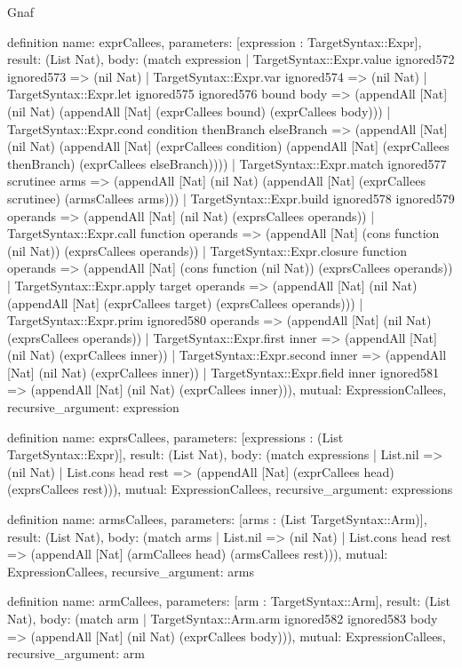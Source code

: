 \begin{lexlean}{Gnaf}
\begin{semanticmodule}
definition{
  name: exprCallees,
  parameters: [expression : TargetSyntax::Expr],
  result: (List Nat),
  body: (match expression
    | TargetSyntax::Expr.value ignored572 ignored573 => (nil Nat)
    | TargetSyntax::Expr.var ignored574 => (nil Nat)
    | TargetSyntax::Expr.let ignored575 ignored576 bound body => (appendAll [Nat] (nil Nat) (appendAll [Nat] (exprCallees bound) (exprCallees body)))
    | TargetSyntax::Expr.cond condition thenBranch elseBranch => (appendAll [Nat] (nil Nat) (appendAll [Nat] (exprCallees condition) (appendAll [Nat] (exprCallees thenBranch) (exprCallees elseBranch))))
    | TargetSyntax::Expr.match ignored577 scrutinee arms => (appendAll [Nat] (nil Nat) (appendAll [Nat] (exprCallees scrutinee) (armsCallees arms)))
    | TargetSyntax::Expr.build ignored578 ignored579 operands => (appendAll [Nat] (nil Nat) (exprsCallees operands))
    | TargetSyntax::Expr.call function operands => (appendAll [Nat] (cons function (nil Nat)) (exprsCallees operands))
    | TargetSyntax::Expr.closure function operands => (appendAll [Nat] (cons function (nil Nat)) (exprsCallees operands))
    | TargetSyntax::Expr.apply target operands => (appendAll [Nat] (nil Nat) (appendAll [Nat] (exprCallees target) (exprsCallees operands)))
    | TargetSyntax::Expr.prim ignored580 operands => (appendAll [Nat] (nil Nat) (exprsCallees operands))
    | TargetSyntax::Expr.first inner => (appendAll [Nat] (nil Nat) (exprCallees inner))
    | TargetSyntax::Expr.second inner => (appendAll [Nat] (nil Nat) (exprCallees inner))
    | TargetSyntax::Expr.field inner ignored581 => (appendAll [Nat] (nil Nat) (exprCallees inner))),
  mutual: ExpressionCallees,
  recursive_argument: expression
}

definition{
  name: exprsCallees,
  parameters: [expressions : (List TargetSyntax::Expr)],
  result: (List Nat),
  body: (match expressions
    | List.nil => (nil Nat)
    | List.cons head rest => (appendAll [Nat] (exprCallees head) (exprsCallees rest))),
  mutual: ExpressionCallees,
  recursive_argument: expressions
}

definition{
  name: armsCallees,
  parameters: [arms : (List TargetSyntax::Arm)],
  result: (List Nat),
  body: (match arms
    | List.nil => (nil Nat)
    | List.cons head rest => (appendAll [Nat] (armCallees head) (armsCallees rest))),
  mutual: ExpressionCallees,
  recursive_argument: arms
}

definition{
  name: armCallees,
  parameters: [arm : TargetSyntax::Arm],
  result: (List Nat),
  body: (match arm
    | TargetSyntax::Arm.arm ignored582 ignored583 body => (appendAll [Nat] (nil Nat) (exprCallees body))),
  mutual: ExpressionCallees,
  recursive_argument: arm
}


\end{semanticmodule}
\end{lexlean}
